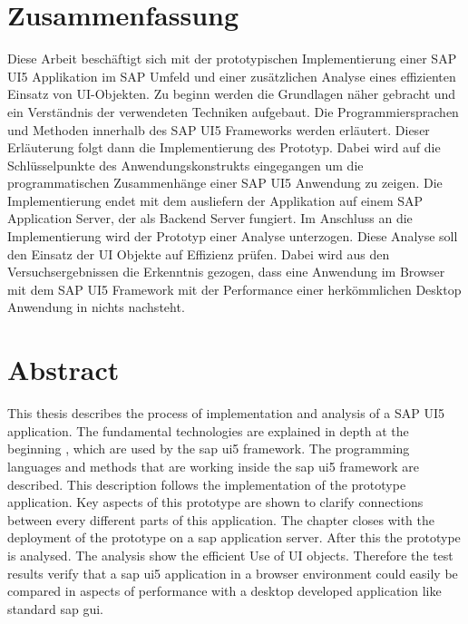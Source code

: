 \section*{Zusammenfassung}
Diese Arbeit beschäftigt sich mit der prototypischen Implementierung einer SAP UI5 Applikation im SAP Umfeld und einer zusätzlichen Analyse eines effizienten Einsatz von UI-Objekten. Zu beginn werden die Grundlagen näher gebracht und ein Verständnis der verwendeten Techniken aufgebaut. Die Programmiersprachen und Methoden innerhalb des SAP UI5 Frameworks werden erläutert. Dieser Erläuterung folgt dann die Implementierung des Prototyp. Dabei wird auf die Schlüsselpunkte des Anwendungskonstrukts eingegangen um die programmatischen Zusammenhänge einer SAP UI5 Anwendung zu zeigen. Die Implementierung endet mit dem ausliefern der Applikation auf einem SAP Application Server, der als Backend Server fungiert. Im Anschluss an die Implementierung wird der Prototyp einer Analyse unterzogen. Diese Analyse soll den Einsatz der UI Objekte auf Effizienz prüfen. Dabei wird aus den Versuchsergebnissen die Erkenntnis gezogen, dass eine Anwendung im Browser mit dem SAP UI5 Framework mit der Performance einer herkömmlichen Desktop Anwendung in nichts nachsteht.


%


\section*{Abstract}
This thesis describes the process of implementation and analysis of a SAP UI5 application. The fundamental technologies are explained in depth at the beginning , which are used by the sap ui5 framework. The programming languages and methods that are working inside the sap ui5 framework are described. This description follows the implementation of the prototype application. Key aspects of this prototype are shown to clarify connections between every different parts of this application. The chapter closes with the deployment of the prototype on a sap application server. After this the prototype is analysed. The analysis show the efficient Use of UI objects. Therefore the test results verify that a sap ui5 application in a browser environment could easily be compared in aspects of performance with a desktop developed application like standard sap gui.